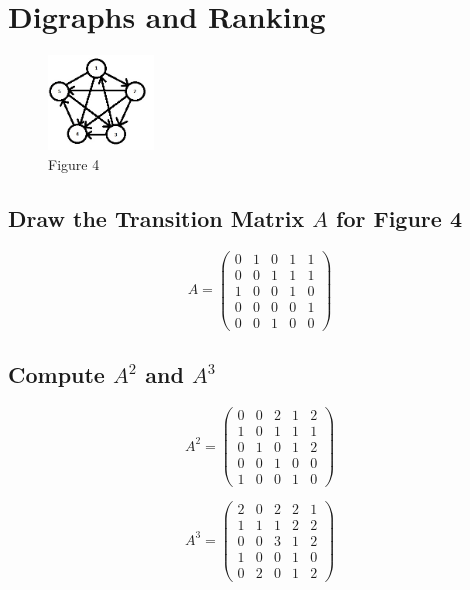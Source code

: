 \documentclass[12pt]{scrreprt}
\begin{document}
\chapter{Digraphs and Ranking} 

\begin{figure}[h]
	\centering
		\includegraphics[width=0.25\textwidth]{figure4}
	\caption{Figure 4}
\end{figure}


\section{Draw the Transition Matrix $A$ for Figure 4}

\[ A = \left( \begin{array}{ccccc}
0 & 1 & 0 & 1 & 1 \\
0 & 0 & 1 & 1 & 1 \\
1 & 0 & 0 & 1 & 0 \\
0 & 0 & 0 & 0 & 1 \\
0 & 0 & 1 & 0 & 0 \end{array} \right)\] 

\section{Compute $A^2$ and $A^3$}

\[ A^2 = \left( \begin{array}{ccccc}
0 & 0 & 2 & 1 & 2 \\
1 & 0 & 1 & 1 & 1 \\
0 & 1 & 0 & 1 & 2 \\
0 & 0 & 1 & 0 & 0 \\
1 & 0 & 0 & 1 & 0 \end{array} \right)\] 

\[ A^3 = \left( \begin{array}{ccccc}
2 & 0 & 2 & 2 & 1 \\
1 & 1 & 1 & 2 & 2 \\
0 & 0 & 3 & 1 & 2 \\
1 & 0 & 0 & 1 & 0 \\
0 & 2 & 0 & 1 & 2 \end{array} \right)\] 
\end{document}
